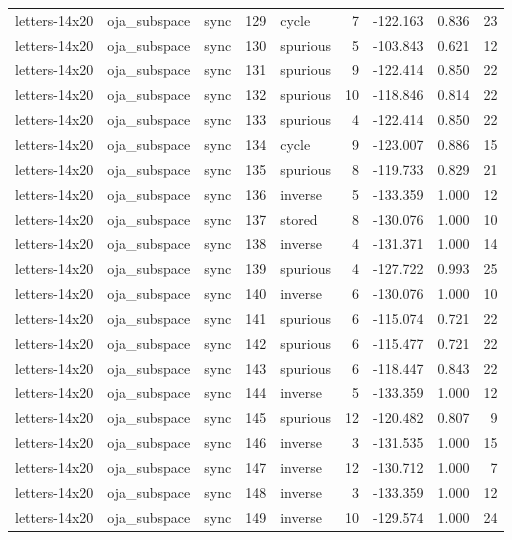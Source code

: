 \begin{tabular}{lllrlrrrr}
letters-14x20 & oja\_subspace & sync & 129 & cycle & 7 & -122.163 & 0.836 & 23 \\
letters-14x20 & oja\_subspace & sync & 130 & spurious & 5 & -103.843 & 0.621 & 12 \\
letters-14x20 & oja\_subspace & sync & 131 & spurious & 9 & -122.414 & 0.850 & 22 \\
letters-14x20 & oja\_subspace & sync & 132 & spurious & 10 & -118.846 & 0.814 & 22 \\
letters-14x20 & oja\_subspace & sync & 133 & spurious & 4 & -122.414 & 0.850 & 22 \\
letters-14x20 & oja\_subspace & sync & 134 & cycle & 9 & -123.007 & 0.886 & 15 \\
letters-14x20 & oja\_subspace & sync & 135 & spurious & 8 & -119.733 & 0.829 & 21 \\
letters-14x20 & oja\_subspace & sync & 136 & inverse & 5 & -133.359 & 1.000 & 12 \\
letters-14x20 & oja\_subspace & sync & 137 & stored & 8 & -130.076 & 1.000 & 10 \\
letters-14x20 & oja\_subspace & sync & 138 & inverse & 4 & -131.371 & 1.000 & 14 \\
letters-14x20 & oja\_subspace & sync & 139 & spurious & 4 & -127.722 & 0.993 & 25 \\
letters-14x20 & oja\_subspace & sync & 140 & inverse & 6 & -130.076 & 1.000 & 10 \\
letters-14x20 & oja\_subspace & sync & 141 & spurious & 6 & -115.074 & 0.721 & 22 \\
letters-14x20 & oja\_subspace & sync & 142 & spurious & 6 & -115.477 & 0.721 & 22 \\
letters-14x20 & oja\_subspace & sync & 143 & spurious & 6 & -118.447 & 0.843 & 22 \\
letters-14x20 & oja\_subspace & sync & 144 & inverse & 5 & -133.359 & 1.000 & 12 \\
letters-14x20 & oja\_subspace & sync & 145 & spurious & 12 & -120.482 & 0.807 & 9 \\
letters-14x20 & oja\_subspace & sync & 146 & inverse & 3 & -131.535 & 1.000 & 15 \\
letters-14x20 & oja\_subspace & sync & 147 & inverse & 12 & -130.712 & 1.000 & 7 \\
letters-14x20 & oja\_subspace & sync & 148 & inverse & 3 & -133.359 & 1.000 & 12 \\
letters-14x20 & oja\_subspace & sync & 149 & inverse & 10 & -129.574 & 1.000 & 24 \\

\end{tabular}
